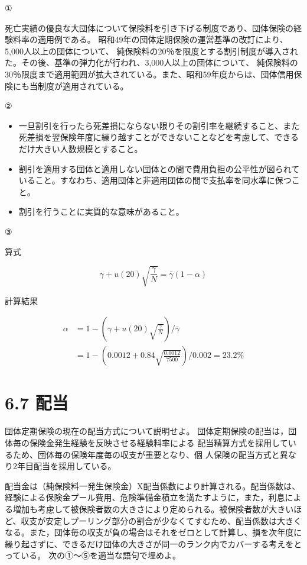 \documentclass[report,gutter=10mm,fore-edge=10mm,uplatex,dvipdfmx]{jlreq}
\begin{document}
①

死亡実績の優良な大団体について保険料を引き下げる制度であり、団体保険の経験料率の適用例である。
昭和49年の団体定期保険の運営基準の改訂により、5,000人以上の団体について、
純保険料の20％を限度とする割引制度が導入された。その後、基準の弾力化が行われ、3,000人以上の団体について、
純保険料の30％限度まで適用範囲が拡大されている。また、昭和59年度からは、団体信用保険にも当制度が適用されている。

②
\begin{itemize}
\item[] 一旦割引を行ったら死差損にならない限りその割引率を継続すること、また死差損を翌保険年度に繰り越すことができないことなどを考慮して、できるだけ大きい人数規模とすること。
\item[] 割引を適用する団体と適用しない団体との間で費用負担の公平性が図られていること。すなわち、適用団体と非適用団体の間で支払率を同水準に保つこと。
\item[] 割引を行うことに実質的な意味があること。
\end{itemize}

③

算式

$$
\gamma+u(20)\sqrt{\frac{\gamma}{N}} = \bar{\gamma}(1-\alpha)
$$

計算結果

\begin{align}
\alpha & = 1-\left(\gamma+u(20)\sqrt{\frac{\gamma}{N}}\right)/\bar{\gamma}\\
&= 1-\left(0.0012 + 0.84\sqrt{\frac{0.0012}{7500}}\right)/0.002=23.2\%
\end{align}

\section{6.7 配当}
団体定期保険の現在の配当方式について説明せよ。
\answer{}
団体定期保険の配当は，団体毎の保険金発生経験を反映させる経験料率による
配当精算方式を採用しているため、団体毎の保険年度毎の収支が重要となり、個
人保険の配当方式と異なり2年目配当を採用している。

配当金は（純保険料一発生保険金）X配当係数により計算される。配当係数は、
経験による保険金プール費用、危険準備金積立を満たすように，また，利息によ
る増加も考慮して被保険者数の大きさにより定められる。被保険者数が大きいほ
ど、収支が安定しプーリング部分の割合が少なくてすむため、配当係数は大きく
なる。また，団体毎の収支が負の場合はそれをゼロとして計算し、損を次年度に
繰り起さずに、できるだけ団体の大きさが同一のランク内でカバーする考えをと
っている。
次の①～⑤を適当な語句で埋めよ。
\end{document}
